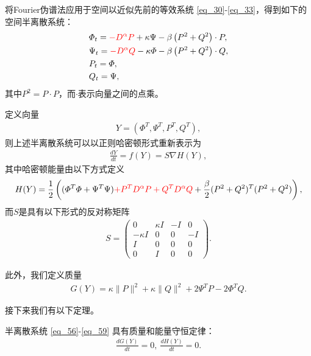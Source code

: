 将Fourier伪谱法应用于空间以近似先前的等效系统 \eqref{eq_30}-\eqref{eq_33}，得到如下的空间半离散系统：
\begin{align}
&\varPhi_{t}=\textcolor[rgb]{1.00,0.00,0.00}{-D^{\alpha}P}+\kappa \Psi-\beta \left( P^{2}+Q^{2}\right)\cdot P,\label{eq_56}\\
&\Psi_{t}=\textcolor[rgb]{1.00,0.00,0.00}{-D^{\alpha}Q}-\kappa \varPhi-\beta \left( P^{2}+Q^{2}\right)\cdot Q,\label{eq_57}\\
&P_t=\varPhi,\label{eq_58}\\
&Q_t=\Psi,\label{eq_59}
\end{align}
其中$P^{2}=P \cdot P$，而$\cdot$表示向量之间的点乘。

定义向量
\begin{align}\label{eq_60a}
Y=\left(\varPhi^{T}, \Psi^{T}, P^{T}, Q^{T}\right),
\end{align}
则上述半离散系统可以以正则哈密顿形式重新表示为
\begin{align}\label{eq_60}
\frac{d Y}{d t}=f(Y)=S \nabla H(Y),
\end{align}
其中哈密顿能量由以下方式定义
\begin{align}\label{eq_61}
	H(Y)=\frac{1}{2}\left((\varPhi^{T}\varPhi+\Psi^{T}\Psi)\textcolor[rgb]{1.00,0.00,0.00}{+P^{T} D^{\alpha} P+Q^{T} D^{\alpha} Q}+\frac{\beta}{2}(P^2+Q^2)^{T}(P^2+Q^2)\right),
\end{align}
而$S$是具有以下形式的反对称矩阵
\begin{align}\label{eq_62}
S=\left(\begin{array}{cccc}
0 & \kappa I & -I & 0 \\
-\kappa I & 0 & 0 & -I \\
I & 0 & 0 & 0 \\
0 & I & 0 & 0
\end{array}\right).
\end{align}

此外，我们定义质量
\begin{align}\label{eq_63}
G(Y)=\kappa\|P\|^{2}+\kappa\|Q\|^{2} +2\Psi^{T}P-2\varPhi^{T}Q.
\end{align}

接下来我们有以下定理。

\begin{theorem}	\label{thm3}
	半离散系统 \eqref{eq_56}-\eqref{eq_59} 具有质量和能量守恒定律：
\begin{align}
\frac{d G(Y)}{d t}=0,~\frac{d H(Y)}{d t}=0.
\end{align}
\end{theorem}

